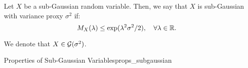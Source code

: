 \begin{definition}
	Let $X$ be a sub-Gaussian random variable. Then, we say that $X$ is sub-Gaussian with variance proxy $\sigma^2$ if:
	\begin{equation}
		M_X(\lambda) \le \exp(\lambda^2\sigma^2/2), \quad \forall \lambda\in\mathbb{R}.	
	\end{equation} 

	\noindent We denote that $X\in\mathcal{G}(\sigma^2)$.
\end{definition} 

\begin{proposition}{Properties of Sub-Gaussian Variables}{props_subgaussian}
	
\end{proposition} 